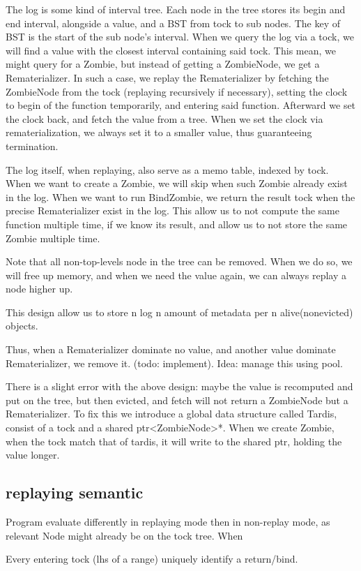 The log is some kind of interval tree. Each node in the tree stores its begin and end interval, alongside a value, and a BST from tock to sub nodes. The key of BST is the start of the sub node’s interval. When we query the log via a tock, we will find a value with the closest interval containing said tock. This mean, we might query for a Zombie, but instead of getting a ZombieNode, we get a Rematerializer.
In such a case, we replay the Rematerializer by fetching the ZombieNode from the tock (replaying recursively if necessary), setting the clock to begin of the function temporarily, and entering said function. Afterward we set the clock back, and fetch the value from a tree.
When we set the clock via rematerialization, we always set it to a smaller value, thus guaranteeing termination.

The log itself, when replaying, also serve as a memo table, indexed by tock. When we want to create a Zombie, we will skip when such Zombie already exist in the log. When we want to run BindZombie, we return the result tock when the precise Rematerializer exist in the log. This allow us to not compute the same function multiple time, if we know its result, and allow us to not store the same Zombie multiple time.

Note that all non-top-levels node in the tree can be removed. When we do so, we will free up memory, and when we need the value again, we can always replay a node higher up.

This design allow us to store n log n amount of metadata per n alive(nonevicted) objects.

Thus, when a Rematerializer dominate no value, and another value dominate Rematerializer, we remove it. (todo: implement). Idea: manage this using pool.

There is a slight error with the above design: maybe the value is recomputed and put on the tree, but then evicted, and fetch will not return a ZombieNode but a Rematerializer. To fix this we introduce a global data structure called Tardis, consist of a tock and a shared ptr<ZombieNode>*. When we create Zombie, when the tock match that of tardis, it will write to the shared ptr, holding the value longer.

\subsection{replaying semantic}
Program evaluate differently in replaying mode then in non-replay mode, as relevant Node might already be on the tock tree. When 

Every entering tock (lhs of a range) uniquely identify a return/bind.

